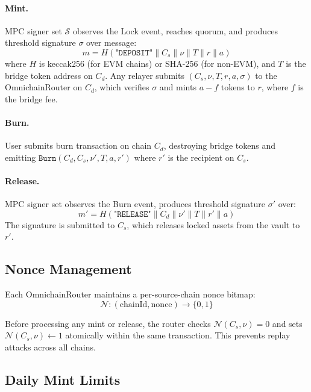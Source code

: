 \documentclass[11pt,twocolumn]{article}
\begin{document}
\paragraph{Mint.} MPC signer set $\mathcal{S}$ observes the Lock event, reaches quorum, and produces threshold signature $\sigma$ over message:
\begin{equation}
  m = H(\texttt{"DEPOSIT"} \| C_s \| \nu \| T \| r \| a)
\end{equation}
where $H$ is keccak256 (for EVM chains) or SHA-256 (for non-EVM), and $T$ is the bridge token address on $C_d$. Any relayer submits $(C_s, \nu, T, r, a, \sigma)$ to the OmnichainRouter on $C_d$, which verifies $\sigma$ and mints $a - f$ tokens to $r$, where $f$ is the bridge fee.

\paragraph{Burn.} User submits burn transaction on chain $C_d$, destroying bridge tokens and emitting $\texttt{Burn}(C_d, C_s, \nu', T, a, r')$ where $r'$ is the recipient on $C_s$.

\paragraph{Release.} MPC signer set observes the Burn event, produces threshold signature $\sigma'$ over:
\begin{equation}
  m' = H(\texttt{"RELEASE"} \| C_d \| \nu' \| T \| r' \| a)
\end{equation}
The signature is submitted to $C_s$, which releases locked assets from the vault to $r'$.

\subsection{Nonce Management}

Each OmnichainRouter maintains a per-source-chain nonce bitmap:
\begin{equation}
  \mathcal{N}: (\text{chainId}, \text{nonce}) \rightarrow \{0, 1\}
\end{equation}

Before processing any mint or release, the router checks $\mathcal{N}(C_s, \nu) = 0$ and sets $\mathcal{N}(C_s, \nu) \leftarrow 1$ atomically within the same transaction. This prevents replay attacks across all chains.

\subsection{Daily Mint Limits}
\end{document}
